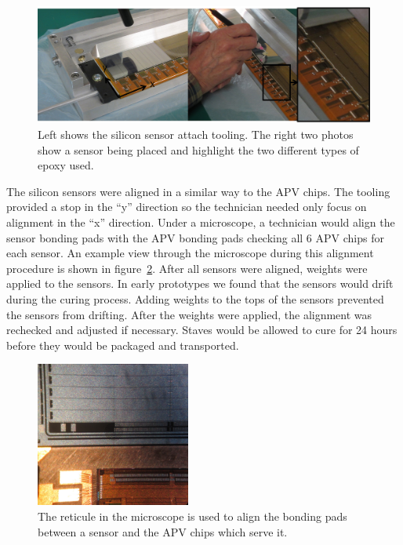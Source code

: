 \documentclass[preprint,12pt]{elsarticle}
\begin{document}
\begin{figure}[h]
\begin{center}
\includegraphics[width=6in, keepaspectratio=true, angle=0]{graphics/si_glue.jpg}
\caption{Left shows the silicon sensor attach tooling.  The right two photos show
a sensor being placed and highlight the two different types of epoxy used.
\label{fig:si_glue}}
\end{center}
\end{figure}
%
The silicon sensors were aligned in a similar way to the APV chips. The tooling
provided a stop in the ``y'' direction so the technician needed only focus on
alignment in the ``x'' direction. Under a microscope, a technician would align the
sensor bonding pads with the APV bonding pads checking all 6 APV chips for each
sensor. An example view through the microscope during this alignment procedure
is shown in figure~\ref{fig:si_align}. After all sensors were aligned, weights were applied to the sensors.
In early prototypes we found that the sensors would drift during the curing
process. Adding weights to the tops of the sensors prevented the sensors from
drifting. After the weights were applied, the alignment was rechecked and
adjusted if necessary. Staves would be allowed to cure for 24 hours before
they would be packaged and transported.

\begin{figure}[h]
\begin{center}
\includegraphics[width=2in, keepaspectratio=true, angle=0]{graphics/si_align.jpg}
\caption{The reticule in the microscope is used to align the bonding pads
between a sensor and the APV chips which serve it.
\label{fig:si_align}}
\end{center}
\end{figure}
%
\end{document}

